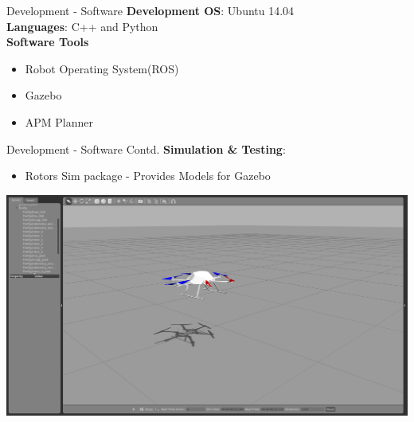 \documentclass[11pt]{beamer}
\begin{document}
\begin{frame}{Development - Software}
\textbf{Development OS}: Ubuntu 14.04\\
\textbf{Languages}: C++ and Python\\
\vspace{5mm}
\textbf{Software Tools}
\begin{itemize}
\item Robot Operating System(ROS)
\item Gazebo
\item APM Planner
\end{itemize}
\end{frame}


\begin{frame}{Development - Software Contd.}
\textbf{Simulation \& Testing}: 
\begin{itemize}
\item Rotors Sim package - Provides Models for Gazebo
\end{itemize}
\centerline{\includegraphics[scale=0.15]{images/Gazebo_Joy.png}}
\end{frame}
\end{document}
